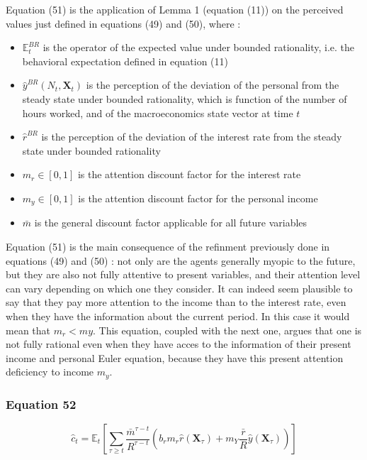 \documentclass{article}
\begin{document}
Equation (51) is the application of Lemma 1 (equation (11)) on the perceived values just defined in equations (49) and (50), where : 
\begin{itemize}
    \item $\mathbb{E}_{t}^{BR}$ is the operator of the expected value under bounded rationality, i.e. the behavioral expectation defined in equation (11)
    \item $\hat{y}^{BR}(N_{t},\textbf{X}_{t})$ is the perception of the deviation of the personal from the steady state under bounded rationality, which is function of the number of hours worked, and of the macroeconomics state vector at time $t$
    \item $\hat{r}^{BR}$ is the perception of the deviation of the interest rate from the steady state under bounded rationality
    \item $m_{r}\in\left[0,1\right]$ is the attention discount factor for the interest rate
    \item $m_{y}\in\left[0,1\right]$ is the attention discount factor for the personal income
    \item $\bar{m}$ is the general discount factor applicable for all future variables
\end{itemize}

Equation (51) is the main consequence of the refinment previously done in equations (49) and (50) : not only are the agents generally myopic to the future, but they are also not fully attentive to present variables, and their attention level can vary depending on which one they consider.
It can indeed seem plausible to say that they pay more attention to the income than to the interest rate, even when they have the information about the current period. In this case it would mean that $m_{r}<m{y}$. 
This equation, coupled with the next one, argues that one is not fully rational even when they have acces to the information of their present income and personal Euler equation, because they have this present attention deficiency to income $m_{y}$.

\subsubsection*{Equation 52}

\begin{equation}\tag{52}
        \hat{c}_{t}=\mathbb{E}_{t}\left[\sum_{\tau\geq t}\frac{\bar{m}^{\tau-t}}{R^{\tau-t}}\left(b_{r}m_{r}\hat{r}(\textbf{X}_{\tau})+m_{Y}\frac{\bar{r}}{R}\hat{y}(\textbf{X}_{\tau})\right)\right]
\end{equation}
\end{document}
